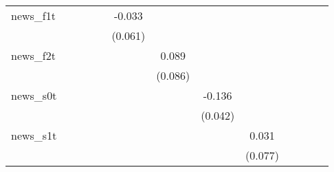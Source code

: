 {\begin{tabular}{l*{12}{c}}
\addlinespace
news\_f1t    &                     &                     &                     &                     &      -0.033         &                     &                     &                     &                     &                     &                     &                     \\
            &                     &                     &                     &                     &     (0.061)         &                     &                     &                     &                     &                     &                     &                     \\
\addlinespace
news\_f2t    &                     &                     &                     &                     &                     &       0.089         &                     &                     &                     &                     &                     &                     \\
            &                     &                     &                     &                     &                     &     (0.086)         &                     &                     &                     &                     &                     &                     \\
\addlinespace
news\_s0t    &                     &                     &                     &                     &                     &                     &      -0.136\sym{***}&                     &                     &                     &                     &                     \\
            &                     &                     &                     &                     &                     &                     &     (0.042)         &                     &                     &                     &                     &                     \\
\addlinespace
news\_s1t    &                     &                     &                     &                     &                     &                     &                     &       0.031         &                     &                     &                     &                     \\
            &                     &                     &                     &                     &                     &                     &                     &     (0.077)         &                     &                     &                     &                     \\

\end{tabular}}
